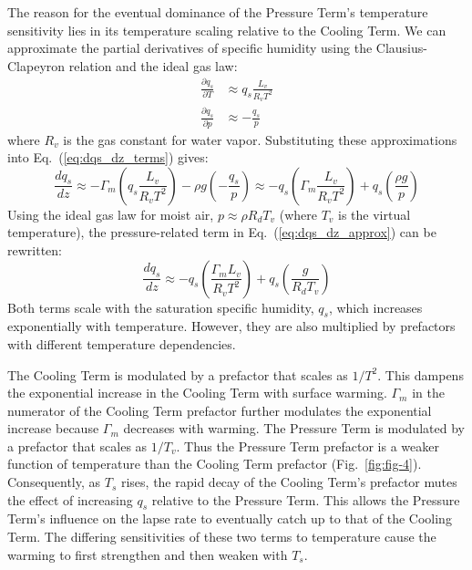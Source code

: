 \documentclass[draft]{ametsocV6.1}
\begin{document}
The reason for the eventual dominance of the Pressure Term's temperature sensitivity lies in its temperature scaling relative to the Cooling Term. We can approximate the partial derivatives of specific humidity using the Clausius-Clapeyron relation and the ideal gas law:
\begin{align}
\frac{\partial q_s}{\partial T}&\approx q_s\frac{L_v}{R_v T^2} \label{eq:dqs_dt_approx} \\
\frac{\partial q_s}{\partial p}&\approx -\frac{q_s}{p} \label{eq:dqs_dp_approx}
\end{align}
where $R_v$ is the gas constant for water vapor. Substituting these approximations into Eq.~(\ref{eq:dqs_dz_terms}) gives:
\begin{equation}
\frac{dq_s}{dz} \approx-\Gamma_m\left(q_s\frac{L_v}{R_v T^2}\right)-\rho g\left(-\frac{q_s}{p}\right) \approx -q_s\left(\Gamma_m\frac{L_v}{R_v T^2}\right)+q_s\left(\frac{\rho g}{p}\right) \label{eq:dqs_dz_approx}
\end{equation}
Using the ideal gas law for moist air, $p\approx\rho R_d T_v$ (where $T_v$ is the virtual temperature), the pressure-related term in Eq.~(\ref{eq:dqs_dz_approx}) can be rewritten:
\begin{equation}
\frac{dq_s}{dz} \approx -q_s \left(\frac{\Gamma_m L_v}{R_v T^2}\right) + q_s \left(\frac{g}{R_d T_v}\right) \label{eq:dqs_dz_prefactors}
\end{equation}
Both terms scale with the saturation specific humidity, $q_s$, which increases exponentially with temperature. However, they are also multiplied by prefactors with different temperature dependencies.

The Cooling Term is modulated by a prefactor that scales as $1/T^2$. This dampens the exponential increase in the Cooling Term with surface warming. $\Gamma_m$ in the numerator of the Cooling Term prefactor further modulates the exponential increase because $\Gamma_m$ decreases with warming. The Pressure Term is modulated by a prefactor that scales as $1/T_v$. Thus the Pressure Term prefactor is a weaker function of temperature than the Cooling Term prefactor (Fig.~\ref{fig:fig-4}). Consequently, as $T_s$ rises, the rapid decay of the Cooling Term's prefactor mutes the effect of increasing $q_s$ relative to the Pressure Term. This allows the Pressure Term's influence on the lapse rate to eventually catch up to that of the Cooling Term. The differing sensitivities of these two terms to temperature cause the warming to first strengthen and then weaken with $T_s$.
\end{document}
